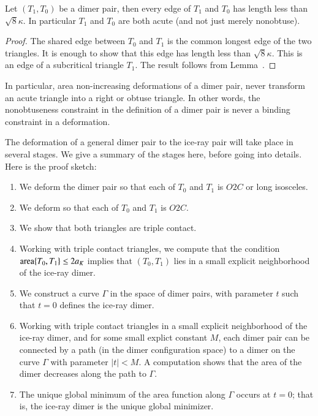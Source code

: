\begin{lemma}  Let $(T_1,T_0)$ be a dimer pair, then every edge of $T_1$ and $T_0$ has length
less than $\sqrt8\kappa$.  In particular $T_1$ and $T_0$ are both acute (and not just merely nonobtuse).
\end{lemma}

\begin{proof}  The shared edge between $T_0$ and $T_1$ is the common longest edge of the
two triangles.  It is enough to show that this edge has length less than $\sqrt8\kappa$.
This is an edge of a subcritical triangle $T_1$. The result follows from Lemma~.
\end{proof}

In particular, area non-increasing deformations of a dimer pair, never transform an acute
triangle into a right or obtuse triangle.  In other words, the nonobtuseness constraint in the
definition of a dimer pair is never a binding constraint in a deformation.

The deformation of a general dimer pair to the ice-ray pair will take place in several
stages.  We give a summary of the stages here, before going into details.  Here is the proof sketch:

\begin{enumerate}
\item We deform the dimer pair so that each of $T_0$ and $T_1$ is $O2C$
or long isosceles.
\item We deform so that each of $T_0$ and $T_1$ is $O2C$.
\item We show that both triangles are triple contact.
\item Working with triple contact triangles, 
we compute that the condition ${\operatorname{area}}\{T_0,T_1\}\le 2a_K$ implies that
$(T_0,T_1)$ lies in a small explicit neighborhood of the ice-ray dimer.
\item We construct a curve $\Gamma$ in the space of dimer pairs, with parameter $t$
such that $t=0$ defines the ice-ray dimer.
\item Working with triple contact triangles in a small explicit neighborhood of the
ice-ray dimer, and for some small explict constant $M$,
each dimer pair can be connected by a path (in the dimer configuration
space) to a dimer on the curve $\Gamma$ with parameter $|t|<M$.
A computation shows that the area of the dimer decreases along the path to $\Gamma$.  
\item The unique global minimum of the area function along $\Gamma$ occurs at $t=0$;
that is, the ice-ray dimer is the unique global minimizer.
\end{enumerate}

